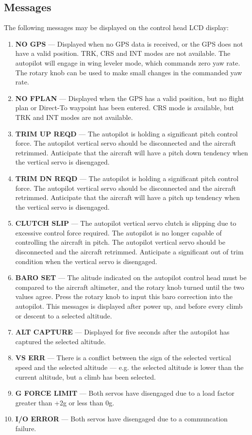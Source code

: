 \subsection*{Messages}
The following messages may be displayed on the control head LCD display:
\begin{enumerate}
\item \textbf{NO GPS} --- Displayed when no GPS data is received, or the GPS does not have a valid position. TRK, CRS and INT modes are not available. The autopilot will engage in wing leveler mode, which commands zero yaw rate. The rotary knob can be used to make small changes in the commanded yaw rate.
\item \textbf{NO FPLAN} --- Displayed when the GPS has a valid position, but no flight plan or Direct-To waypoint has been entered. CRS mode is available, but TRK and INT modes are not available.
\item \textbf{TRIM UP REQD} --- The autopilot is holding a significant pitch control force.  The autopilot vertical servo should be disconnected and the aircraft retrimmed.  Anticipate that the aircraft will have a pitch down tendency when the vertical servo is disengaged.
\item \textbf{TRIM DN REQD} --- The autopilot is holding a significant pitch control force.  The autopilot vertical servo should be disconnected and the aircraft retrimmed.  Anticipate that the aircraft will have a pitch up tendency when the vertical servo is disengaged.
\item \textbf{CLUTCH SLIP} --- The autopilot vertical servo clutch is slipping due to excessive control force required.  The autopilot is no longer capable of controlling the aircraft in pitch.  The autopilot vertical servo should be disconnected and the aircraft retrimmed.  Anticipate a significant out of trim condition when the vertical servo is disengaged.
\item \textbf{BARO SET} --- The alitude indicated on the autopilot control head must be compared to the aircraft altimeter, and the rotary knob turned until the two values agree.  Press the rotary knob to input this baro correction into the autopilot.  This messages is displayed after power up, and before every climb or descent to a selected altitude.
\item \textbf{ALT CAPTURE} --- Displayed for five seconds after the autopilot has captured the selected altitude.
\item \textbf{VS ERR} --- There is a conflict between the sign of the selected vertical speed and the selected altitude --- e.g. the selected altitude is lower than the current altitude, but a climb has been selected.
\item \textbf{G FORCE LIMIT} --- Both servos have disengaged due to a load factor greater than +2g or less than 0g.
\item \textbf{I/O ERROR} --- Both servos have disengaged due to a communcation failure.
\end{enumerate}

